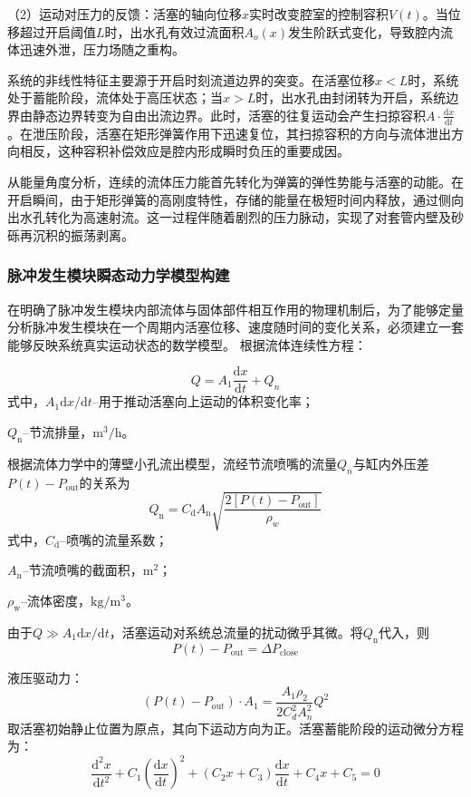 （2）运动对压力的反馈：活塞的轴向位移$x$实时改变腔室的控制容积$V(t)$。当位移超过开启阈值$L$时，出水孔有效过流面积$A_o(x)$发生阶跃式变化，导致腔内流体迅速外泄，压力场随之重构。

系统的非线性特征主要源于开启时刻流道边界的突变。在活塞位移$x<L$时，系统处于蓄能阶段，流体处于高压状态；当$x>L$时，出水孔由封闭转为开启，系统边界由静态边界转变为自由出流边界。此时，活塞的往复运动会产生扫掠容积$A\cdot\frac{\mathrm{d}x}{\mathrm{d}t}$。在泄压阶段，活塞在矩形弹簧作用下迅速复位，其扫掠容积的方向与流体泄出方向相反，这种容积补偿效应是腔内形成瞬时负压的重要成因。

从能量角度分析，连续的流体压力能首先转化为弹簧的弹性势能与活塞的动能。在开启瞬间，由于矩形弹簧的高刚度特性，存储的能量在极短时间内释放，通过侧向出水孔转化为高速射流。这一过程伴随着剧烈的压力脉动，实现了对套管内壁及砂砾再沉积的振荡剥离。


\subsubsection{脉冲发生模块瞬态动力学模型构建}
在明确了脉冲发生模块内部流体与固体部件相互作用的物理机制后，为了能够定量分析脉冲发生模块在一个周期内活塞位移、速度随时间的变化关系，必须建立一套能够反映系统真实运动状态的数学模型。
根据流体连续性方程：

\begin{equation}
	Q = A_1\frac{\mathrm{d}x}{\mathrm{d}t}+Q_n
\end{equation}
式中，$A_1{\mathrm{d}x}/{\mathrm{d}t}$--用于推动活塞向上运动的体积变化率；

$Q_\mathrm{n}$--节流排量，$\mathrm{m^3/h}$。

根据流体力学中的薄壁小孔流出模型，流经节流喷嘴的流量$Q_n$与缸内外压差$P(t)-P_{\mathrm{out}}$的关系为
\begin{equation}
	Q_\mathrm{n}=C_\mathrm{d}A_\mathrm{n}\sqrt{\frac{2\left[P(t)-P_{\mathrm{out}}\right]}{\rho_w}}
\end{equation}
式中，$C_\mathrm{d}$--喷嘴的流量系数；

$A_\mathrm{n}$--节流喷嘴的截面积，$\mathrm{m^2}$；

$\rho_\mathrm{w}$--流体密度，$\mathrm{kg/m^3}$。

由于$Q \gg A_1{\mathrm{d}x}/{\mathrm{d}t}$，活塞运动对系统总流量的扰动微乎其微。将$Q_\mathrm{n}$代入，则
\begin{equation}
	P(t)-P_{\mathrm{out}}=\Delta P_{\mathrm{close}}
\end{equation}


液压驱动力：
\begin{equation}
	\left(P(t)-P_{\mathrm{out}}\right)\cdot A_1=\frac{A_1\rho_2}{2C_d^2A_n^2}Q^2
\end{equation}
取活塞初始静止位置为原点，其向下运动方向为正。活塞蓄能阶段的运动微分方程为：
\begin{equation}
	\frac{\mathrm{d}^2x}{\mathrm{d}t^2}+C_1\left(\frac{\mathrm{d}x}{\mathrm{d}t}\right)^2+\left(C_2 x+C_3\right)\frac{\mathrm{d}x}{\mathrm{d}t}+C_4 x+ C_5 =0
\end{equation}

